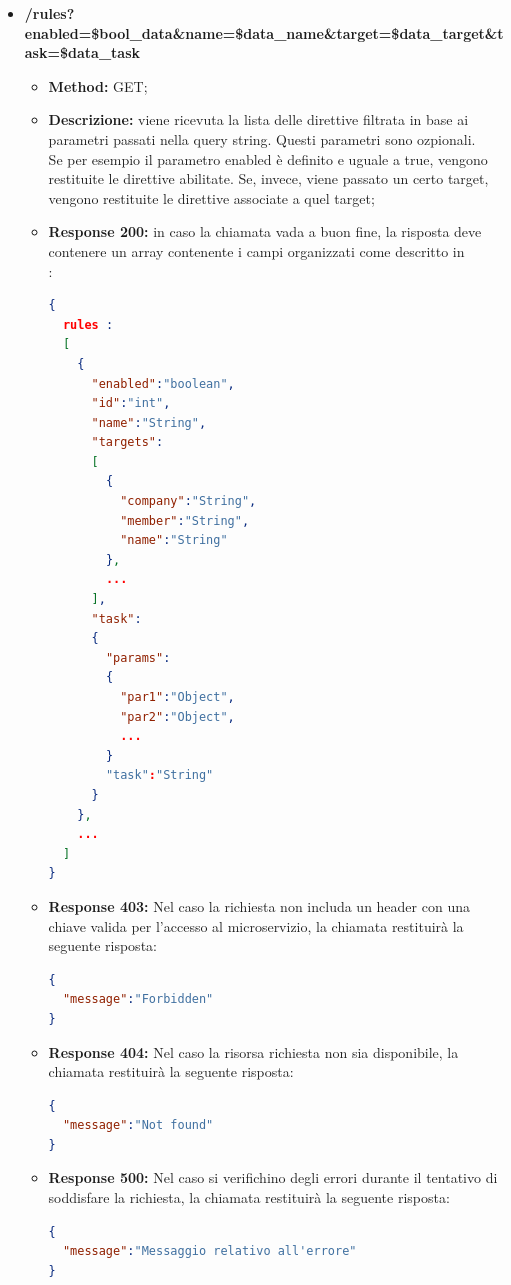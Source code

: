 \begin{itemize}

\item \textbf{/rules?enabled=\$bool\_data\&name=\$data\_name\&target=\$data\_target\&task=\$data\_task}

\begin{itemize}
\item \textbf{Method:} GET;
\item \textbf{Descrizione:} viene ricevuta la lista delle direttive filtrata in base ai parametri passati nella query string. Questi parametri sono ozpionali.\\
Se per esempio il parametro enabled è definito e uguale a true, vengono restituite le direttive abilitate.
Se, invece, viene passato un certo target, vengono restituite le direttive associate a quel target;
\item \textbf{Response 200:} in caso la chiamata vada a buon fine, la risposta deve contenere un array contenente i campi organizzati come descritto in \\:
\begin{lstlisting}[language=json,firstnumber=1]
{
  rules :
  [
    {
      "enabled":"boolean",
      "id":"int",
      "name":"String",
      "targets":
      [
        {
          "company":"String",
          "member":"String",
          "name":"String"
        },
        ...
      ],
      "task":
      {
        "params":
        {
          "par1":"Object",
          "par2":"Object",
          ...
        }
        "task":"String"
      }
    },
    ...
  ]
}
\end{lstlisting}
\item \textbf{Response 403:} Nel caso la richiesta non includa un header  con una chiave valida per l'accesso al microservizio, la chiamata restituirà la seguente risposta:
\begin{lstlisting}[language=json,firstnumber=1]
{
  "message":"Forbidden"
}
\end{lstlisting}
\item \textbf{Response 404:} Nel caso la risorsa richiesta non sia disponibile, la chiamata restituirà la seguente risposta:
\begin{lstlisting}[language=json,firstnumber=1]
{
  "message":"Not found"
}
\end{lstlisting}
\item \textbf{Response 500:} Nel caso si verifichino degli errori durante il tentativo di soddisfare la richiesta, la chiamata restituirà la seguente risposta:
\begin{lstlisting}[language=json,firstnumber=1]
{
  "message":"Messaggio relativo all'errore"
}
\end{lstlisting}
\end{itemize}


\end{itemize}
